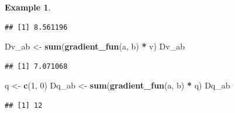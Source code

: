 \documentclass[
]{book}
\newenvironment{Shaded}{\begin{snugshade}}{\end{snugshade}}
\newcommand{\CommentTok}[1]{\textcolor[rgb]{0.56,0.35,0.01}{\textit{#1}}}
\newcommand{\DataTypeTok}[1]{\textcolor[rgb]{0.13,0.29,0.53}{#1}}
\newcommand{\DecValTok}[1]{\textcolor[rgb]{0.00,0.00,0.81}{#1}}
\newcommand{\KeywordTok}[1]{\textcolor[rgb]{0.13,0.29,0.53}{\textbf{#1}}}
\newcommand{\NormalTok}[1]{#1}
\newcommand{\OperatorTok}[1]{\textcolor[rgb]{0.81,0.36,0.00}{\textbf{#1}}}
\newcommand{\StringTok}[1]{\textcolor[rgb]{0.31,0.60,0.02}{#1}}
\theoremstyle{definition}
\theoremstyle{definition}
\newtheorem{example}{Example}[chapter]
\theoremstyle{definition}
\theoremstyle{remark}
\begin{document}
\begin{example}
\begin{Shaded}
\end{Shaded}

\begin{verbatim}
## [1] 8.561196
\end{verbatim}

\begin{Shaded}
\begin{Highlighting}[]
\NormalTok{Dv_ab <-}\StringTok{ }\KeywordTok{sum}\NormalTok{(}\KeywordTok{gradient_fun}\NormalTok{(a, b) }\OperatorTok{*}\StringTok{ }\NormalTok{v)}
\NormalTok{Dv_ab}
\end{Highlighting}
\end{Shaded}

\begin{verbatim}
## [1] 7.071068
\end{verbatim}

\begin{Shaded}
\begin{Highlighting}[]
\NormalTok{q <-}\StringTok{ }\KeywordTok{c}\NormalTok{(}\DecValTok{1}\NormalTok{, }\DecValTok{0}\NormalTok{)}
\NormalTok{Dq_ab <-}\StringTok{ }\KeywordTok{sum}\NormalTok{(}\KeywordTok{gradient_fun}\NormalTok{(a, b) }\OperatorTok{*}\StringTok{ }\NormalTok{q)}
\NormalTok{Dq_ab}
\end{Highlighting}
\end{Shaded}

\begin{verbatim}
## [1] 12
\end{verbatim}


\end{example}
\end{document}
